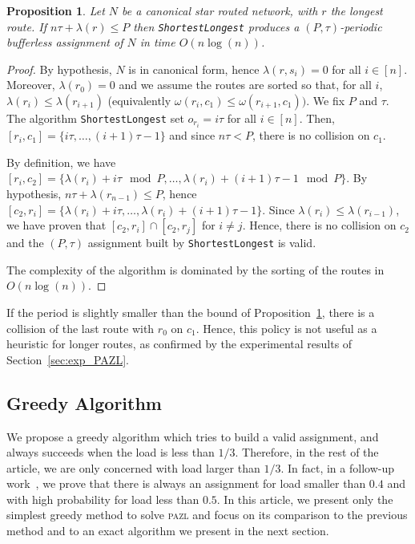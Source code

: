 \documentclass[a4paper,10pt]{journal}
\newcommand\shortestlongest{\texttt{ShortestLongest}\xspace}
\newtheorem{proposition}{Proposition}
\newcommand\pazl{\textsc{pazl}\xspace}
\begin{document}
      \begin{proposition} Let $N$ be a canonical star routed network, with $r$ the longest route. If $n\tau + \lambda(r) \leq P$ then \shortestlongest produces a $(P,\tau)$-periodic bufferless assignment of $N$ in time $O(n\log(n))$.\label{prop:SL}
      \end{proposition}
      \begin{proof}
       By hypothesis, $N$ is in canonical form, hence $\lambda(r,s_i) = 0$ for all $i \in [n]$. Moreover, $\lambda(r_0) = 0$ and we assume the routes are sorted so that, for all $i$, $\lambda(r_i) \leq \lambda(r_{i+1})$ (equivalently $\omega(r_i,c_1) \leq \omega(r_{i+1},c_1))$. We fix $P$ and $\tau$. The algorithm \shortestlongest set $o_{r_i} = i\tau$ for all $i \in [n]$. Then, $[r_{i},c_1] = \{i\tau,\dots, (i+1)\tau -1\}$ and since $n\tau < P$, there is no collision on $c_1$. 

       By definition, we have  $[r_{i},c_2] = \{\lambda(r_{i}) + i\tau \mod P, \dots, \lambda(r_{i}) + (i+1)\tau -1 \mod P\}$. By hypothesis, $n\tau + \lambda(r_{n-1}) \leq P$, hence $[c_2,r_{i}] = \{\lambda(r_{i}) + i\tau, \dots, \lambda(r_{i}) + (i+1)\tau -1\}$. Since  $\lambda(r_i) \leq \lambda(r_{i-1})$, we have proven that $[c_2,r_{i}] \cap [c_2,r_{j}]$ for $i \neq j$. Hence, there is no collision on $c_2$ and the $(P,\tau)$ assignment built by \shortestlongest is valid.

 		The complexity of the algorithm is dominated by the sorting of the routes in $O(n\log(n))$. 
      \end{proof}

      If the period is slightly smaller than the bound of Proposition~\ref{prop:SL}, there is a collision of the last route with $r_0$ on $c_1$. Hence, this policy is not useful as a heuristic for longer routes, as confirmed by the experimental results of Section~\ref{sec:exp_PAZL}. 

   
    \subsection{Greedy Algorithm}
    

     We propose a greedy algorithm which tries to build a valid assignment, and always succeeds when the load is less than $1/3$. Therefore, in the rest of the article, we are only concerned with load larger than $1/3$. In fact, in a follow-up work~\cite{guiraud2020scheduling}, we prove that there is always an assignment for load smaller than $0.4$ and with high probability for load less than $0.5$. In this article, we present only the simplest greedy method to solve \pazl and focus on its comparison to the previous method and to an exact algorithm we present in the next section.   
\end{document}
